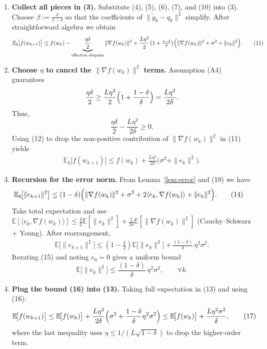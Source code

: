 \documentclass{article}
\newcommand{\E}{\mathbb{E}}
\begin{document}
\begin{enumerate}
\item[Step 9.] \textbf{Collect all pieces in (3).}
Substitute (4), (5), (6), (7), and (10) into (3).  Choose $\beta:=\frac{\delta}{1-\delta}$
so that the coefficients of $\|\tilde g_k-q_k\|^{2}$ simplify.
After straightforward algebra we obtain
\begin{align}
\E_k\!\bigl[f(w_{k+1})\bigr]
\le
f(w_k)
-\underbrace{\frac{\eta\delta}{2}}_{\text{effective stepsize}}
\|\nabla f(w_k)\|^{2}
+\frac{L\eta^{2}}{2}\bigl(1+\tfrac{1-\delta}{\delta}\bigr)
\Bigl(\|\nabla f(w_k)\|^{2}+\sigma^{2}+\|e_k\|^{2}\Bigr).
\tag{11}
\end{align}
\item[Step 10.] \textbf{Choose $\eta$ to cancel the $\|\nabla f(w_k)\|^{2}$ terms.}
Assumption (A4) guarantees
\[
\frac{\eta\delta}{2}\ge \frac{L\eta^{2}}{2}\Bigl(1+\frac{1-\delta}{\delta}\Bigr)
= \frac{L\eta^{2}}{2\delta}.
\]
Thus,
\[
\frac{\eta\delta}{2}-\frac{L\eta^{2}}{2\delta}
\ge 0.
\tag{12}
\]
Using (12) to drop the non‑positive contribution of $\|\nabla f(w_k)\|^{2}$ in (11) yields
\begin{align}
\E_k\!\bigl[f(w_{k+1})\bigr]
\le
f(w_k)
+\frac{L\eta^{2}}{2\delta}\bigl(\sigma^{2}+\|e_k\|^{2}\bigr).
\tag{13}
\end{align}
\item[Step 11.] \textbf{Recursion for the error norm.}
From Lemma~\ref{lem:error} and (10) we have
\begin{align}
\E_k\!\bigl[\|e_{k+1}\|^{2}\bigr]
&\le (1-\delta)\Bigl(\|\nabla f(w_k)\|^{2}+\sigma^{2}
+2\langle e_k,\nabla f(w_k)\rangle+\|e_k\|^{2}\Bigr).
\tag{14}
\end{align}
Take total expectation and use $\E[\langle e_k,\nabla f(w_k)\rangle]\le
\frac{\delta}{2}\E[\|e_k\|^{2}]
+\frac{1}{2\delta}\E[\|\nabla f(w_k)\|^{2}]$ (Cauchy–Schwarz + Young).
After rearrangement,
\begin{align}
\E\!\bigl[\|e_{k+1}\|^{2}\bigr]
\le (1-\tfrac{\delta}{2})\E\!\bigl[\|e_k\|^{2}\bigr]
+\frac{(1-\delta)}{\delta}\,\eta^{2}\sigma^{2}.
\tag{15}
\end{align}
Iterating (15) and noting $e_0=0$ gives a uniform bound
\[
\E\!\bigl[\|e_k\|^{2}\bigr]\le \frac{(1-\delta)}{\delta}\,\eta^{2}\sigma^{2},
\qquad\forall k.
\tag{16}
\]
\item[Step 12.] \textbf{Plug the bound (16) into (13).}
Taking full expectation in (13) and using (16):
\begin{align}
\E\!\bigl[f(w_{k+1})\bigr]
\le
\E\!\bigl[f(w_k)\bigr]
+\frac{L\eta^{2}}{2\delta}\Bigl(\sigma^{2}
+\frac{1-\delta}{\delta}\eta^{2}\sigma^{2}\Bigr)
\le
\E\!\bigl[f(w_k)\bigr]
+\frac{L\eta^{2}\sigma^{2}}{\delta},
\tag{17}
\end{align}
where the last inequality uses $\eta\le 1/(L\sqrt{1-\delta})$ to drop the higher‑order term.


\end{enumerate}
\end{document}
